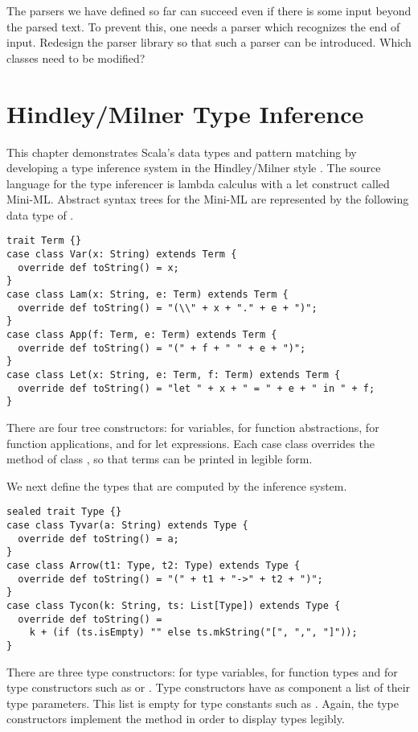 {\begin{exercise}\label{exercise:end-marker} The parsers we have defined so
far can succeed even if there is some input beyond the parsed text. To
prevent this, one needs a parser which recognizes the end of input.
Redesign the parser library so that such a parser can be introduced.
Which classes need to be modified?
\end{exercise}

\chapter{\label{sec:hm}Hindley/Milner Type Inference}

This chapter demonstrates Scala's data types and pattern matching by
developing a type inference system in the Hindley/Milner style
\cite{milner:polymorphism}. The source language for the type inferencer is
lambda calculus with a let construct called Mini-ML. Abstract syntax
trees for the Mini-ML are represented by the following data type of
.
\begin{lstlisting}
trait Term {}
case class Var(x: String) extends Term {
  override def toString() = x;
}
case class Lam(x: String, e: Term) extends Term {
  override def toString() = "(\\" + x + "." + e + ")";
}
case class App(f: Term, e: Term) extends Term {
  override def toString() = "(" + f + " " + e + ")";
}
case class Let(x: String, e: Term, f: Term) extends Term {
  override def toString() = "let " + x + " = " + e + " in " + f;
}
\end{lstlisting}
There are four tree constructors:  for variables, 
for function abstractions,  for function applications, and
 for let expressions. Each case class overrides the
 method of class , so that terms can be
printed in legible form.

We next define the types that are
computed by the inference system.
\begin{lstlisting}
sealed trait Type {}
case class Tyvar(a: String) extends Type {
  override def toString() = a;
}
case class Arrow(t1: Type, t2: Type) extends Type {
  override def toString() = "(" + t1 + "->" + t2 + ")";
}
case class Tycon(k: String, ts: List[Type]) extends Type {
  override def toString() = 
    k + (if (ts.isEmpty) "" else ts.mkString("[", ",", "]"));
}
\end{lstlisting}
There are three type constructors:  for type variables,
 for function types and  for type constructors
such as  or . Type constructors have as
component a list of their type parameters. This list is empty for type
constants such as . Again, the type constructors
implement the  method in order to display types legibly.

}
